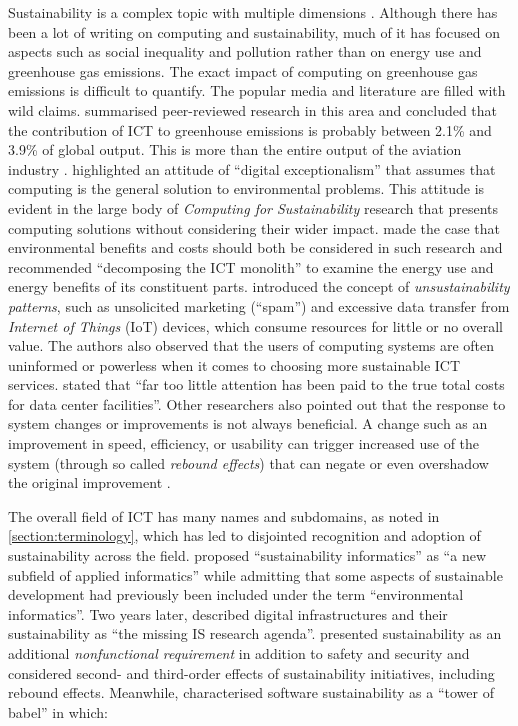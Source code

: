 Sustainability is a complex topic with multiple dimensions \citep{UnitedNations2015}. Although there has been a lot of writing on computing and sustainability, much of it has focused on aspects such as social inequality and pollution \citep{Hilty2011a} rather than on energy use and greenhouse gas emissions. The exact impact of computing on greenhouse gas emissions is difficult to quantify. The popular media and literature are filled with wild claims. \citet{Freitag2021} summarised peer-reviewed research in this area and concluded that the contribution of \gls{ICT} to greenhouse emissions is probably between 2.1\% and 3.9\% of global output. This is more than the entire output of the aviation industry \citep{EESI2022}. \citet{Knowles2022} highlighted an attitude of \enquote{digital exceptionalism} that assumes that computing is the general solution to environmental problems. This attitude is evident in the large body of \emph{Computing for Sustainability} research that presents computing solutions without considering their wider impact. \citet{Coroama2009} made the case that environmental benefits and costs should both be considered in such research and recommended \enquote{decomposing the \gls{ICT} monolith} to examine the energy use and energy benefits of its constituent parts. \citet{Tocze2022a} introduced the concept of \emph{unsustainability patterns}, such as unsolicited marketing (\enquote{spam}) and excessive data transfer from \emph{Internet of Things} (IoT) devices, which consume resources for little or no overall value. The authors also observed that the users of computing systems are often uninformed or powerless when it comes to choosing more sustainable \gls{ICT} services. \citet{Koomey2009} stated that \enquote{far too little attention has been paid to the true total costs for data center facilities}. Other researchers also pointed out that the response to system changes or improvements is not always beneficial. A change such as an improvement in speed, efficiency, or usability can trigger increased use of the system (through so called \emph{rebound effects}) that can negate or even overshadow the original improvement \citep{Hilty2006} \citep{Gossart2015} \citep{Adelmeyer2017}.

\label{A61}
The overall field of \gls{ICT} has many names and subdomains, as noted in \autoref{section:terminology}, which has led to disjointed recognition and adoption of sustainability across the field. \citet{Naumann2008} proposed \enquote{sustainability informatics} as \enquote{a new subfield of applied informatics} while admitting that some aspects of sustainable development had previously been included under the term \enquote{environmental informatics}. Two years later, \citet{Tilson2010} described digital infrastructures and their sustainability as \enquote{the missing IS research agenda}.  \citet{Penzenstadler2014} presented sustainability as an additional \emph{nonfunctional requirement} in addition to safety and security and considered second- and third-order effects of sustainability initiatives, including rebound effects. Meanwhile, \citet{Venters2014} characterised software sustainability as a \enquote{tower of babel} in which:


